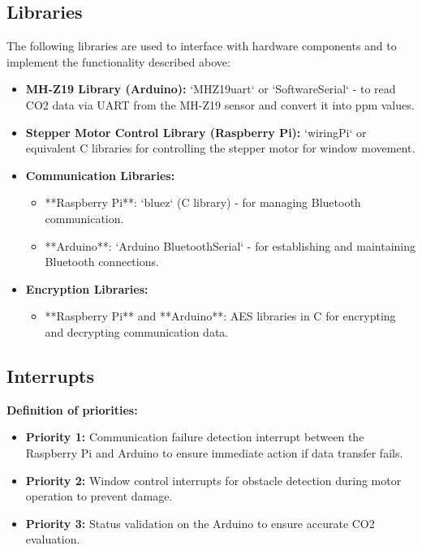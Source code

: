 \subsection{Libraries}
The following libraries are used to interface with hardware components and to implement the functionality described above:
\begin{itemize}
    \item \textbf{MH-Z19 Library (Arduino):} `MHZ19uart` or `SoftwareSerial` - to read CO2 data via UART from the MH-Z19 sensor and convert it into ppm values.
    \item \textbf{Stepper Motor Control Library (Raspberry Pi):} `wiringPi` or equivalent C libraries for controlling the stepper motor for window movement.
    \item \textbf{Communication Libraries:}
        \begin{itemize}
            \item **Raspberry Pi**: `bluez` (C library) - for managing Bluetooth communication.
            \item **Arduino**: `Arduino BluetoothSerial` - for establishing and maintaining Bluetooth connections.
        \end{itemize}
    \item \textbf{Encryption Libraries:}
        \begin{itemize}
            \item **Raspberry Pi** and **Arduino**: AES libraries in C for encrypting and decrypting communication data.
        \end{itemize}
\end{itemize}

\subsection{Interrupts}
\textbf{Definition of priorities:}
\begin{itemize}
    \item \textbf{Priority 1:} Communication failure detection interrupt between the Raspberry Pi and Arduino to ensure immediate action if data transfer fails.
    \item \textbf{Priority 2:} Window control interrupts for obstacle detection during motor operation to prevent damage.
    \item \textbf{Priority 3:} Status validation on the Arduino to ensure accurate CO2 evaluation.
\end{itemize}

